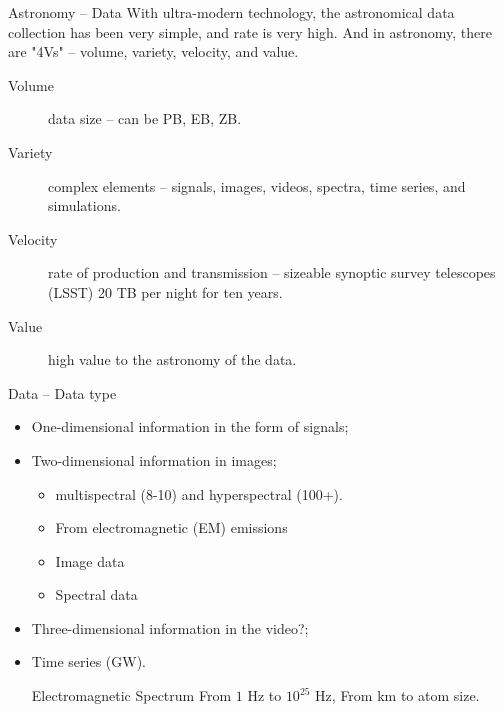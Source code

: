 \documentclass[aspectratio=1610,xcolor={dvipsnames},hyperref={colorlinks,unicode,linkcolor=violet,anchorcolor=blueviolet,citecolor=YellowOrange,filecolor=black,urlcolor=Aquamarine}]{beamer}
\begin{document}
\begin{frame}[label={sec:org38403e1}]{Astronomy -- Data}
With ultra-modern technology, the astronomical data collection has
been very simple, and rate is very high.  And in astronomy, there are
"4Vs" -- volume, variety, velocity, and value.

\begin{description}
\item[{Volume}] data size -- can be PB, EB, ZB.
\item[{Variety}] complex elements  -- signals, images, videos, spectra,
time series, and simulations.
\item[{Velocity}] rate of production and transmission -- sizeable synoptic
survey telescopes (LSST) 20 TB per night for ten years.
\item[{Value}] high value to the astronomy of the data.
\end{description}
\end{frame}

\begin{frame}[label={sec:orga961a0f}]{Data -- Data type}
\begin{itemize}
\item One-dimensional information in the form of signals;
\item Two-dimensional information in images;
\begin{itemize}
\item multispectral (8-10) and hyperspectral (100+).
\item From electromagnetic (EM) emissions
\item Image data
\item Spectral data
\end{itemize}
\item Three-dimensional information in the video?;
\item Time series (GW).

\item[{Electromagnetic Spectrum}] From \(1\) Hz to \(10^{25}\) Hz,  From km to
atom size.
\end{itemize}
\end{frame}
\end{document}
